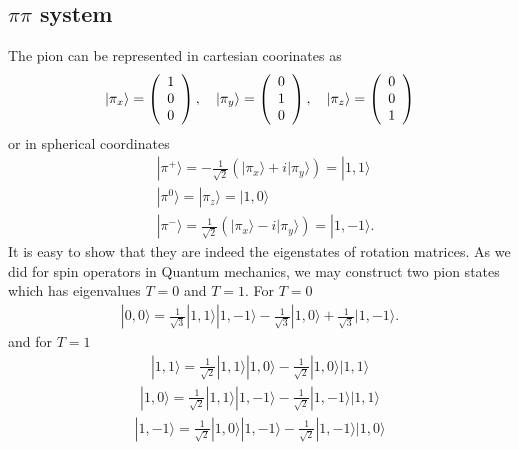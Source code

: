 \documentclass[aps,prd,preprintnumbers,showpacs,showkeys,nofootinbib,
superscriptaddress,fleqn,floatfix,tightenlines, 10pt]{revtex4-1}
\begin{document}
\subsection{$\pi\pi$ system}
The pion can be represented in cartesian coorinates as
\begin{align} \label{cartesian pion}
	|\pi_x\rangle = \left( \begin{array}{c c c} 1 \\ 0 \\ 0 \end{array} \right), \quad
	|\pi_y\rangle = \left( \begin{array}{c c c} 0 \\ 1 \\ 0 \end{array} \right), \quad
	|\pi_z\rangle = \left( \begin{array}{c c c} 0 \\ 0 \\ 1 \end{array} \right)
\end{align}
or in spherical coordinates
\begin{align}
	&|\pi^+\rangle = -\frac{1}{\sqrt{2}} (|\pi_x\rangle + i |\pi_y\rangle) = |1,1\rangle\\
	&|\pi^0\rangle = |\pi_z\rangle = |1,0\rangle\\
	&|\pi^-\rangle = \frac{1}{\sqrt{2}} (|\pi_x\rangle - i |\pi_y\rangle) = |1,-1\rangle.
\end{align}
It is easy to show that they are indeed the eigenstates of rotation matrices. As we did for spin operators in Quantum
mechanics, we may construct two pion states which has eigenvalues $T=0$ and $T=1$. For $T=0$
\begin{align}
	|0,0\rangle = \frac{1}{\sqrt{3}} |1,1\rangle |1,-1\rangle - \frac{1}{\sqrt{3}} |1,0\rangle + \frac{1}{\sqrt{3}} |1,-1\rangle.
\end{align}
and for $T=1$
\begin{align}
	|1,1\rangle = \frac{1}{\sqrt{2}} |1,1\rangle |1,0\rangle - \frac{1}{\sqrt{2}} |1,0\rangle |1,1\rangle
\end{align}
\begin{align}
	|1,0\rangle = \frac{1}{\sqrt{2}} |1,1\rangle |1,-1\rangle - \frac{1}{\sqrt{2}} |1,-1\rangle |1,1\rangle
\end{align}
\begin{align}
	|1,-1\rangle = \frac{1}{\sqrt{2}} |1,0\rangle |1,-1\rangle - \frac{1}{\sqrt{2}} |1,-1\rangle |1,0\rangle
\end{align}
\end{document}
